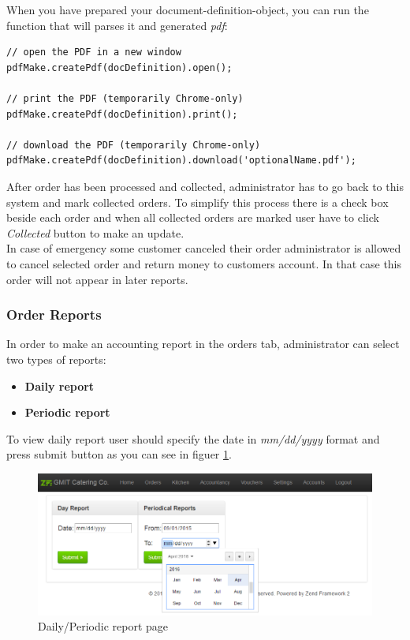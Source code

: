 			
			When you have prepared your document-definition-object, you can run the function that will parses it and generated \textit{pdf}:
			\\
			
			\begin{verbatim}
// open the PDF in a new window
pdfMake.createPdf(docDefinition).open();
 
// print the PDF (temporarily Chrome-only)
pdfMake.createPdf(docDefinition).print();
 
// download the PDF (temporarily Chrome-only)
pdfMake.createPdf(docDefinition).download('optionalName.pdf');
			\end{verbatim}
			
			After order has been processed and collected, administrator has to go back to this system and mark collected orders. To simplify this process there is a check box beside each order and when all collected orders are marked user have to click \textit{Collected} button to make an update.
			\\
			In case of emergency some customer canceled their order administrator is allowed to cancel selected order and return money to customers account. In that case this order will not appear in later reports.
			
		\subsubsection{Order Reports}
			In order to make an accounting report in the orders tab, administrator can select two types of reports:
			\begin{itemize}
				\item \textbf{Daily report}
				\item \textbf{Periodic report}
			\end{itemize} 
			
			To view daily report user should specify the date in \textit{mm/dd/yyyy} format and press submit button as you can see in figuer \ref{fig:select-report-page}. 
			
			\begin{figure}[H]
				\centering
				\includegraphics[width=1\textwidth]{img/zf2/01-canteen_select_periodic_report_page.png}
				\caption{Daily/Periodic report page}
				\label{fig:select-report-page}
			\end{figure}
			
